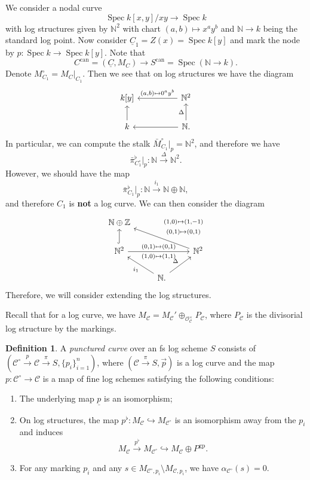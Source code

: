 \documentclass{amsart}
\theoremstyle{definition}
\newtheorem{defn}[thm]{Definition}
\theoremstyle{remark}
\theoremstyle{plain}
\theoremstyle{definition}
\theoremstyle{remark}
\newcommand{\N}{\mathbb{N}}
\newcommand{\Z}{\mathbb{Z}}
\newcommand{\mc}[1]{\mathcal{#1}}
\newcommand{\mr}[1]{\mathrm{#1}}
\newcommand{\on}[1]{\operatorname{#1}}
\newcommand{\ul}[1]{\underline{#1}}
\newcommand{\1}{\mathbf{1}}
\newcommand{\2}{\mathbf{2}}
\newcommand{\3}{\mathbf{3}}
\DeclareMathOperator{\Spec}{Spec}
\begin{document}
We consider a nodal curve
\[ \Spec k[x,y]/xy \to \Spec k \]
with log structures given by \(\N^2\) with chart \((a,b) \mapsto x^a y^b\) and \(\N \to k\) being the standard log point. Now consider \(\ul{C}_1 = Z(x) = \Spec k[y]\) and mark the node by \(p \colon \Spec k \to \Spec k[y]\). Note that
\[ C^{\on{can}} = (\ul{C}, M_C) \to S^{\on{can}} = \Spec(\N \to k). \]
Denote \(M_{C_1}^{\circ} = M_C|_{C_1}\). Then we see that on log structures we have the diagram
\begin{equation*}
\begin{tikzcd}
    k[y] & & \N^2 \ar{ll}[swap]{(a,b) \mapsto 0^a y^b} \\
    k \ar{u} & & \N \ar{ll} \ar{u}{\Delta}.
\end{tikzcd}
\end{equation*}
In particular, we can compute the stalk \(\bar{M}_{C_1}^{\circ}|_p = \N^2\), and therefore we have
\[ \bar{\pi}_{C_1^{\circ}}^{\flat} |_p \colon \N \xrightarrow{\Delta} \N^2. \]
However, we should have the map
\[ \bar{\pi}^{\flat}_{C_1}|_p \colon \N \xrightarrow{i_1} \N \oplus \N, \]
and therefore \(C_1\) is \textbf{not} a log curve. We can then consider the diagram
\begin{equation*}
\begin{tikzcd}
    \N \oplus \Z \\
    \N^2 \ar[hookrightarrow]{u} \ar{rr}{(0,1)\mapsto (0,1)}[swap]{(1,0)\mapsto (1,1)} & & \N^2 \ar{ull}[swap]{\Vectorstack{{(1,0)\mapsto(1,-1)} {(0,1)\mapsto(0,1)}}} \\
    & \N \ar{ul}{i_1} \ar{ur}{\Delta}.
\end{tikzcd}
\end{equation*}
Therefore, we will consider extending the log structures.

Recall that for a log curve, we have \(M_{\mc{C}} = M_{\mc{C}}' \oplus_{\mc{O}_{\mc{C}}^{\times}} P_{\mc{C}}\), where \(P_{\mc{C}}\) is the divisorial log structure by the markings.

\begin{defn}
    A \textit{punctured curve} over an fs log scheme \(S\) consists of \((\mc{C}^{\circ} \xrightarrow{p} \mc{C} \xrightarrow{\pi} S, \{p_i\}_{i=1}^n)\), where \((\mc{C} \xrightarrow{\pi} S, \vec{p})\) is a log curve and the map \(p \colon \mc{C}^{\circ} \to \mc{C}\) is a map of fine log schemes satisfying the following conditions:
    \begin{enumerate}
        \item The underlying map \(\ul{p}\) is an isomorphism;
        \item On log structures, the map \(p^{\flat} \colon M_{\mc{C}} \hookrightarrow M_{\mc{C}^{\circ}}\) is an isomorphism away from the \(p_i\) and induces
            \[ M_{\mc{C}} \xrightarrow{p^{\flat}} M_{\mc{C}^{\circ}} \hookrightarrow M_{\mc{C}} \oplus P^{\mr{gp}}. \]
        \item For any marking \(p_i\) and any \(s \in M_{\mc{C}^{\circ}, p_i} \setminus M_{\mc{C}, p_i}\), we have \(\alpha_{\mc{C}^{\circ}}(s) = 0\).
    \end{enumerate}
\end{defn}
\end{document}
